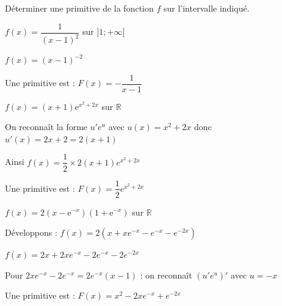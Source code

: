 \documentclass[11pt,a4paper]{article}  %
\begin{document}
\vspace*{-0.5cm}
\exerciceDS{}
Déterminer une primitive de la fonction $f$ sur l'intervalle indiqué.

	\begin{enumMet}
	\item $f(x)=\dfrac{1}{(x-1)^2}$ sur $] 1 ;+\infty[$
	\begin{corrBox}
		$f(x) = (x-1)^{-2}$
			
		Une primitive est : $F(x) = -\dfrac{1}{x-1}$
	\end{corrBox}
	\item $f(x)=(x+1) \mathrm{e}^{x^2+2 x}$ sur $\mathbb{R}$
	\begin{corrBox}
		On reconnaît la forme $u'e^u$ avec $u(x) = x^2 + 2x$ donc $u'(x) = 2x + 2 = 2(x+1)$
			
		Ainsi $f(x) = \dfrac{1}{2} \times 2(x+1)e^{x^2+2x}$
			
		Une primitive est : $F(x) = \dfrac{1}{2}e^{x^2+2x}$
	\end{corrBox}
	\item $f(x)=2\left(x-\mathrm{e}^{-x}\right)\left(1+\mathrm{e}^{-x}\right)$ sur $\mathbb{R}$
	\begin{corrBox}
		Développons : $f(x) = 2(x + xe^{-x} - e^{-x} - e^{-2x})$
			
		$f(x) = 2x + 2xe^{-x} - 2e^{-x} - 2e^{-2x}$
			
		Pour $2xe^{-x} - 2e^{-x} = 2e^{-x}(x-1)$ : on reconnaît $(u'e^u)'$ avec $u = -x$
			
		Une primitive est : $F(x) = x^2 - 2xe^{-x} + e^{-2x}$
	\end{corrBox}
\end{enumMet}


\vspace*{-0.5cm}
\exerciceDS{}
\end{document}
